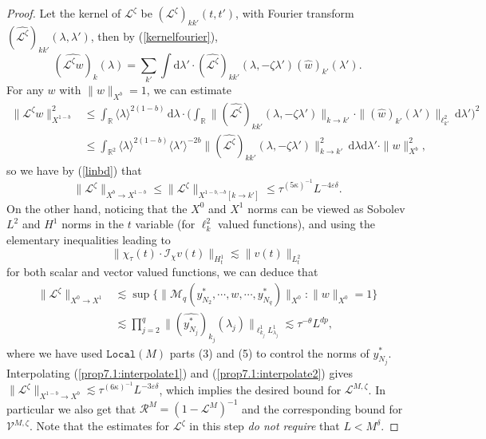 \documentclass[11 pt,reqno]{amsart}
\theoremstyle{definition}
\theoremstyle{remark}
\numberwithin{equation}{section}
\newcommand{\Ic}{\mathcal{I}}
\renewcommand{\Mc}{\mathcal{M}}
\newcommand{\Rb}{\mathbb{R}}
\newcommand{\Ls}{\mathscr{L}}
\newcommand{\Rs}{\mathscr{R}}
\newcommand{\Vs}{\mathscr{V}}
\begin{document}
{\begin{proof}
Let the kernel of $\Ls^\zeta$ be $(\Ls^\zeta)_{kk'}(t,t')$, with Fourier transform $(\widehat{\Ls^\zeta})_{kk'}(\lambda,\lambda')$, then by (\ref{kernelfourier}),
\[(\widehat{\Ls^\zeta w})_k(\lambda)=\sum_{k'}\int\mathrm{d}\lambda'\cdot (\widehat{\Ls^\zeta})_{kk'}(\lambda,-\zeta\lambda')(\widehat{w})_{k'}(\lambda').\] For any $w$ with $\|w\|_{X^{b}}=1$, we can estimate
\[
\begin{split}\|\Ls^\zeta w\|_{X^{1-b}}^2&\leq\int_\Rb\langle \lambda\rangle^{2(1-b)}\,\mathrm{d}\lambda\cdot\bigg(\int_{\Rb}\|(\widehat{\Ls^\zeta})_{kk'}(\lambda,-\zeta\lambda')\|_{k\to k'}\cdot\|(\widehat{w})_{k'}(\lambda')\|_{\ell_{k'}^2}\,\mathrm{d}\lambda'\bigg)^2\\
&\leq\int_{\Rb^2}\langle \lambda\rangle^{2(1-b)}\langle\lambda'\rangle^{-2b}\|(\widehat{\Ls^\zeta})_{kk'}(\lambda,-\zeta\lambda')\|_{k\to k'}^2\,\mathrm{d}\lambda\mathrm{d}\lambda'\cdot\|w\|_{X^b}^2,
\end{split}\] so we have by (\ref{linbd}) that \begin{equation}\label{prop7.1:interpolate1}\|\Ls^\zeta\|_{X^b\to X^{1-b}}\leq\|\Ls^\zeta\|_{X^{1-b,-b}[k\to k']}\leq\tau^{(5\kappa)^{-1}}L^{-4\varepsilon\delta}.\end{equation} On the other hand, noticing that the $X^0$ and $X^1$ norms can be viewed as Sobolev $L^2$ and $H^1$ norms in the $t$ variable (for $\ell_k^2$ valued functions), and using the elementary inequalities leading to
\begin{equation}\label{elementary}\|\chi_\tau(t)\cdot\Ic_\chi v(t)\|_{H_t^1}\lesssim\|v(t)\|_{L_t^2}\end{equation} for both scalar and vector valued functions, we can deduce that
\begin{equation}\label{prop7.1:interpolate2}
\begin{split}\|\Ls^\zeta\|_{X^0\to X^1}&\lesssim\sup\big\{\|\Mc_q(y_{N_2}^*,\cdots,w,\cdots,y_{N_{q}}^*)\|_{X^0}:\|w\|_{X^0}=1\big\}\\
&\lesssim\prod_{j=2}^{q}\|(\widehat{y_{N_j}^*})_{k_j}(\lambda_j)\|_{\ell_{k_j}^1L_{\lambda_j}^1}\lesssim\tau^{-\theta}L^{dp},
\end{split}
\end{equation} where we have used $\mathtt{Local}(M)$ parts (3) and (5) to control the norms of $y_{N_j}^*$. Interpolating (\ref{prop7.1:interpolate1}) and (\ref{prop7.1:interpolate2}) gives $\|\Ls^\zeta\|_{X^{1-b}\to X^{b}}\lesssim\tau^{(6\kappa)^{-1}}L^{-3\varepsilon\delta}$, which implies the desired bound for $\Ls^{M,\zeta}$. In particular we also get that $\Rs^M=(1-\Ls^M)^{-1}$ and the corresponding bound for $\Vs^{M,\zeta}$. Note that the estimates for $\Ls^{\zeta}$ in this step \emph{do not require} that $L<M^\delta$.


\end{proof}}
\end{document}
